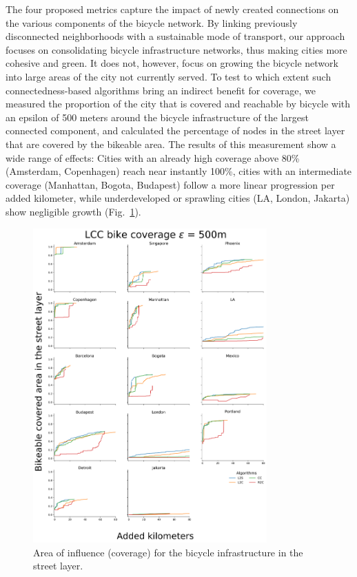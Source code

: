 The four proposed metrics capture the impact of newly created connections on the various components of the bicycle network. By linking previously disconnected neighborhoods with a sustainable mode of transport, our approach focuses on consolidating bicycle infrastructure networks, thus making cities more cohesive and green. It does not, however, focus on growing the bicycle network into large areas of the city not currently served. To test to which extent such connectedness-based algorithms bring an indirect benefit for coverage, we measured the proportion of the city that is covered and reachable by bicycle with an epsilon of 500 meters around the bicycle infrastructure of the largest connected component, and calculated the percentage of nodes in the street layer that are covered by the bikeable area. The results of this measurement show a wide range of effects: Cities with an already high coverage above 80\% (Amsterdam, Copenhagen) reach near instantly 100\%, cities with an intermediate coverage (Manhattan, Bogota, Budapest) follow a more linear progression per added kilometer, while underdeveloped or sprawling cities (LA, London, Jakarta) show negligible growth (Fig.~\ref{fig:Coverage}).

\begin{figure}[th!]
  \centering
  \includegraphics[width=0.8\textwidth]{images/datadriven/Reviewer_Coverage.png}
  \caption[Bicycle infrastructure service area]{Area of influence (coverage) for the bicycle infrastructure in the street layer.}
  \label{fig:Coverage}
\end{figure}

